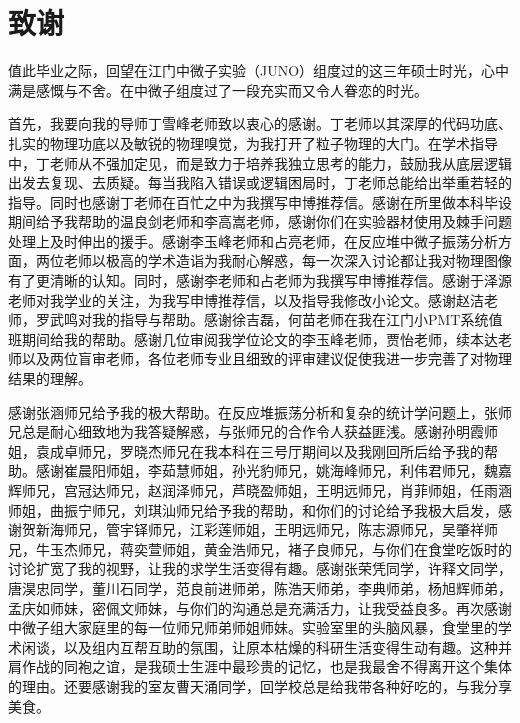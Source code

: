\chapter[致谢]{致\quad 谢}%

值此毕业之际，回望在江门中微子实验（JUNO）组度过的这三年硕士时光，心中满是感慨与不舍。在中微子组度过了一段充实而又令人眷恋的时光。

首先，我要向我的导师丁雪峰老师致以衷心的感谢。丁老师以其深厚的代码功底、扎实的物理功底以及敏锐的物理嗅觉，为我打开了粒子物理的大门。在学术指导中，丁老师从不强加定见，而是致力于培养我独立思考的能力，鼓励我从底层逻辑出发去复现、去质疑。每当我陷入错误或逻辑困局时，丁老师总能给出举重若轻的指导。同时也感谢丁老师在百忙之中为我撰写申博推荐信。感谢在所里做本科毕设期间给予我帮助的温良剑老师和李高嵩老师，感谢你们在实验器材使用及棘手问题处理上及时伸出的援手。感谢李玉峰老师和占亮老师，在反应堆中微子振荡分析方面，两位老师以极高的学术造诣为我耐心解惑，每一次深入讨论都让我对物理图像有了更清晰的认知。同时，感谢李老师和占老师为我撰写申博推荐信。感谢于泽源老师对我学业的关注，为我写申博推荐信，以及指导我修改小论文。感谢赵洁老师，罗武鸣对我的指导与帮助。感谢徐吉磊，何苗老师在我在江门小PMT系统值班期间给我的帮助。感谢几位审阅我学位论文的李玉峰老师，贾怡老师，续本达老师以及两位盲审老师，各位老师专业且细致的评审建议促使我进一步完善了对物理结果的理解。

感谢张涵师兄给予我的极大帮助。在反应堆振荡分析和复杂的统计学问题上，张师兄总是耐心细致地为我答疑解惑，与张师兄的合作令人获益匪浅。感谢孙明霞师姐，袁成卓师兄，罗晓杰师兄在我本科在三号厅期间以及我刚回所后给予我的帮助。感谢崔晨阳师姐，李茹慧师姐，孙光豹师兄，姚海峰师兄，利伟君师兄，魏嘉辉师兄，宫冠达师兄，赵润泽师兄，芦晓盈师姐，王明远师兄，肖菲师姐，任雨涵师姐，曲振宁师兄，刘琪汕师兄给予我的帮助，和你们的讨论给予我极大启发，感谢贺新海师兄，管宇铎师兄，江彩莲师姐，王明远师兄，陈志源师兄，吴肇祥师兄，牛玉杰师兄，蒋奕萱师姐，黄金浩师兄，褚子良师兄，与你们在食堂吃饭时的讨论扩宽了我的视野，让我的求学生活变得有趣。感谢张荣凭同学，许释文同学，唐淏忠同学，董川石同学，范良前进师弟，陈浩天师弟，李典师弟，杨旭辉师弟，孟庆如师妹，密佩文师妹，与你们的沟通总是充满活力，让我受益良多。再次感谢中微子组大家庭里的每一位师兄师弟师姐师妹。实验室里的头脑风暴，食堂里的学术闲谈，以及组内互帮互助的氛围，让原本枯燥的科研生活变得生动有趣。这种并肩作战的同袍之谊，是我硕士生涯中最珍贵的记忆，也是我最舍不得离开这个集体的理由。还要感谢我的室友曹天涌同学，回学校总是给我带各种好吃的，与我分享美食。

